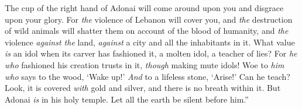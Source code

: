 \begin{biblechapter}
The cup of the right hand of Adonai 
will come around upon you 
and disgrace upon your glory.
\verse For \textit{the} violence of Lebanon will cover you, 
and \textit{the} destruction of wild animals will shatter them 
on account of the blood of humanity, 
and \textit{the} violence \textit{against the} land, 
\textit{against} a city and all the inhabitants in it.
\verse What value \textit{is} an idol 
when its carver has fashioned it, 
a molten idol, a teacher of lies? 
For \textit{he who} fashioned his creation trusts in it, 
\textit{though} making mute idols!
\verse Woe to \textit{him who} says to the wood, ‘Wake up!’ 
\textit{And} to a lifeless stone, ‘Arise!’ 
Can he teach? 
Look, it is covered \textit{with} gold and silver, 
and there is no breath within it.
\verse But Adonai \textit{is} in his holy temple. 
Let all the earth be silent before him.”
\end{biblechapter}

